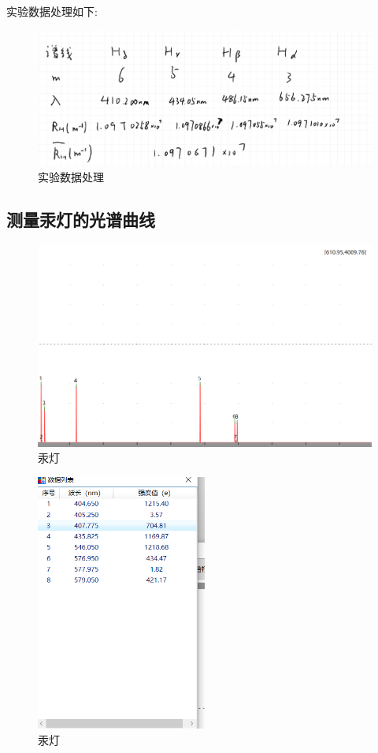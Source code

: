 \documentclass{article}
\begin{document}
实验数据处理如下:

\begin{figure}[H]
    \centering
    \includegraphics[width=1\textwidth]{1.jpg}
    \caption{\label{Lab12}实验数据处理}
    \end{figure}


\subsection*{测量汞灯的光谱曲线}
\begin{figure}[H]
    \centering
    \includegraphics[width=1\textwidth]{虚拟1/汞灯1.png}
    \caption{\label{Lab12}汞灯}
    \end{figure}

    \begin{figure}[H]
        \centering
        \includegraphics[width=0.5\textwidth]{虚拟1/汞灯2.png}
        \caption{\label{Lab12}汞灯}
        \end{figure}
\end{document}
